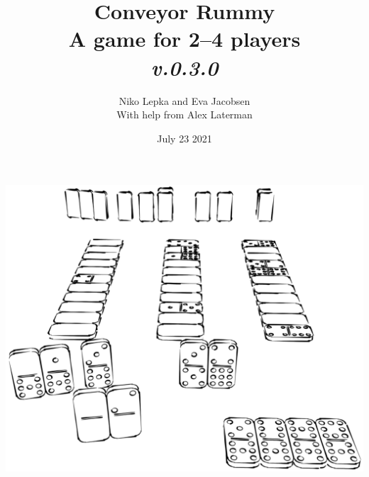 \documentclass[a5paper]{article}
\title{%
    Conveyor Rummy\\%
    \large A game for 2--4 players\\%
    \normalsize \textit{v.0.3.0}
}
\author{Niko Lepka and Eva Jacobsen\\%
    \footnotesize With help from Alex Laterman}
\date{July 23 2021}
\begin{document}
\maketitle

\noindent\includegraphics[width = \linewidth]{dominoes-gameplay.png}







\end{document}
